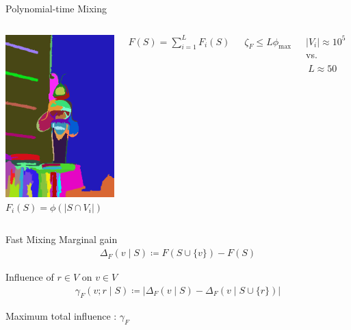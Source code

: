 \documentclass[mathserif]{beamer}
\newcommand{\qboxa}[1]{%
\begin{tcolorbox}[enhanced jigsaw,size=tight,hbox,boxsep=4pt,boxrule=1pt,coltext=textcolor,colframe=col1,opacityback=0,opacityframe=1]
\strut #1
\end{tcolorbox}%
}
\begin{document}
\begin{frame}{Polynomial-time Mixing}
\vspace{0.5em}
\begin{columns}[c]
\centering
\includegraphics[width=1.85in]{figures/bee_superpixels.png}
$F_i(S) = \phi\left(|S \cap V_i|\right)$

\vspace{1em}
$F(S) = \displaystyle\sum_{i=1}^L F_i(S)$

\vspace{3em}
$\zeta_F \leq L \phi_{\textrm{max}}$

\vspace{3em}
\centering
\qboxa{
$|V_i| \approx 10^5\ $ vs. $\ L \approx 50$
}
\end{columns}
\end{frame}

\begin{frame}{Fast Mixing}
Marginal gain
\begin{align*}
\Delta_F(v \mid S) \coloneqq F(S \cup \{v\}) - F(S)
\end{align*}

\vspace{1em}
Influence of $r \in V$ on $v \in V$
\begin{align*}
\gamma_F(v; r \mid S) \coloneqq \big|\Delta_F(v \mid S) - \Delta_F(v \mid S \cup \{r\})\big|
\end{align*}

\vspace{1em}
Maximum total influence :\hspace{0.5em} $\gamma_F$
\end{frame}
\end{document}
